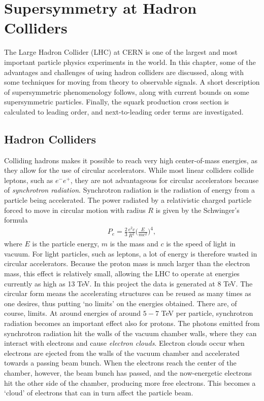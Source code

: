 \documentclass[twoside,english]{uiofysmaster}
\begin{document}
\tableofcontents

\chapter{Supersymmetry at Hadron Colliders}

The Large Hadron Collider (LHC) at CERN is one of the largest and most important particle physics experiments in the world. In this chapter, some of the advantages and challenges of using hadron colliders are discussed, along with some techniques for moving from theory to observable signals. A short description of supersymmetric phenomenology follows, along with current bounds on some supersymmetric particles. Finally, the squark production cross section is calculated to leading order, and next-to-leading order terms are investigated.

\section{Hadron Colliders}

Colliding hadrons makes it possible to reach very high center-of-mass energies, as they allow for the use of circular accelerators. While most linear colliders collide leptons, such as $e^- e^+$, they are not advantageous for circular accelerators because of \textit{synchrotron radiation}. Synchrotron radiation is the radiation of energy from a particle being accelerated. The power radiated by a relativistic charged particle forced to move in circular motion with radius $R$ is given by the Schwinger's formula \cite{Balerna2015}
\begin{align}
P_e = \frac{2}{3} \frac{e^2c }{R^2} \Bigg( \frac{E}{mc^2} \Bigg)^4,
\end{align}
where $E$ is the particle energy, $m$ is the mass and $c$ is the speed of light in vacuum. For light particles, such as leptons, a lot of energy is therefore wasted in circular accelerators. Because the proton mass is much larger than the electron mass, this effect is relatively small, allowing the LHC to operate at energies currently as high as 13 TeV. In this project the data is generated at $8$ TeV. The circular form means the accelerating structures can be reused as many times as one desires, thus putting `no limits' on the energies obtained. There are, of course, limits. At around energies of around $5-7$ TeV per particle, synchrotron radiation becomes an important effect also for protons. The photons emitted from synchrotron radiation hit the walls of the vacuum chamber walls, where they can interact with electrons and cause \textit{electron clouds}. Electron clouds occur when electrons are ejected from the walls of the vacuum chamber and accelerated towards a passing beam bunch. When the electrons reach the center of the chamber, however, the beam bunch has passed, and the now-energetic electrons hit the other side of the chamber, producing more free electrons. This becomes a `cloud' of electrons that can in turn affect the particle beam. 
\end{document}
